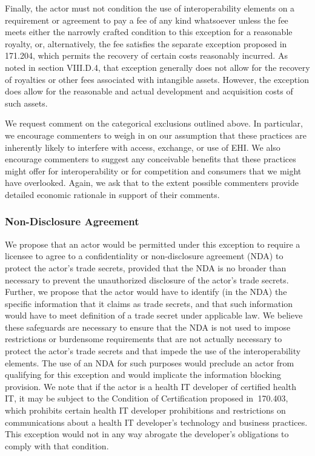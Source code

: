 \documentclass[twoside,11pt]{article}
\begin{document}
          Finally, the actor must not condition the use of interoperability elements on a requirement or agreement to pay a fee of any kind whatsoever unless the fee meets either the narrowly crafted condition to this exception for a reasonable royalty, or, alternatively, the fee satisfies the separate exception proposed in \textsection{} 171.204, which permits the recovery of certain costs reasonably incurred. As noted in section VIII.D.4, that exception generally does not allow for the recovery of royalties or other fees associated with intangible assets. However, the exception does allow for the reasonable and actual development and acquisition costs of such assets.


          We request comment on the categorical exclusions outlined above. In particular, we encourage commenters to weigh in on our assumption that these practices are inherently likely to interfere with access, exchange, or use of EHI. We also encourage commenters to suggest any conceivable benefits that these practices might offer for interoperability or for competition and consumers that we might have overlooked. Again, we ask that to the extent possible commenters provide detailed economic rationale in support of their comments.


          \subsubsection{Non-Disclosure Agreement}

          We propose that an actor would be permitted under this exception to require a licensee to agree to a confidentiality or non-disclosure agreement (NDA) to protect the actor's trade secrets, provided that the NDA is no broader than necessary to prevent the unauthorized disclosure of the actor's trade secrets. Further, we propose that the actor would have to identify (in the NDA) the specific information that it claims as trade secrets, and that such information would have to meet definition of a trade secret under applicable law. We believe these safeguards are necessary to ensure that the NDA is not used to impose restrictions or burdensome requirements that are not actually necessary to protect the actor's trade secrets and that impede the use of the interoperability elements. The use of an NDA for such purposes would preclude an actor from qualifying for this exception and would implicate the information blocking provision. We note that if the actor is a health IT developer of certified health IT, it may be subject to the Condition of Certification proposed in \textsection{} 170.403, which prohibits certain health IT developer prohibitions and restrictions on communications about a health IT developer's technology and business practices. This exception would not in any way abrogate the developer's obligations to comply with that condition.
\end{document}
